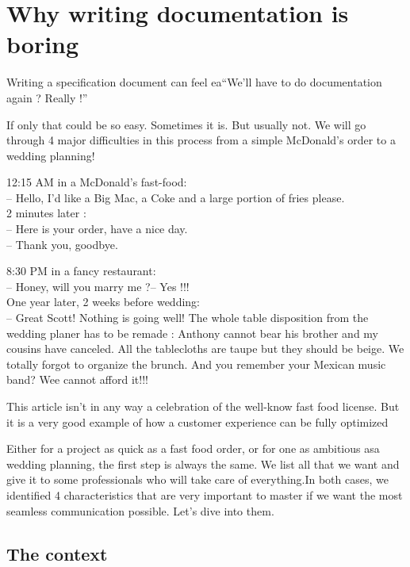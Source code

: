 \setchapterpreamble[u]{\margintoc}
\chapter{Why writing documentation is boring}
\label{sec:WhyBoring}

Writing a specification document can feel ea“We’ll have to do documentation again ? Really !”

If only that could be so easy. Sometimes it is. But usually not. We will go through 4 major difficulties in this process from a simple McDonald’s order to a wedding planning! 

12:15 AM in a McDonald’s fast-food:\\
– Hello, I’d like a Big Mac, a Coke and a large portion of fries please.\\
2 minutes later :\\
– Here is your order, have a nice day.\\
– Thank you, goodbye.

8:30 PM in a fancy restaurant:\\
– Honey, will you marry me ?– Yes !!!\\
One year later, 2 weeks before wedding:\\
– Great Scott! Nothing is going well! The whole table disposition from the wedding planer has to be remade : Anthony cannot bear his brother and my cousins have canceled. All the tablecloths are taupe but they should be beige. We totally forgot to organize the brunch. And you remember your Mexican music band? Wee cannot afford it!!!

\begin{kaobox}[frametitle=Disclaimer]
	This article isn’t in any way a celebration of the well-know fast food license. But it is a very good example of how a customer experience can be fully optimized
\end{kaobox}

Either for a project as quick as a fast food order, or for one as ambitious asa wedding planning, the first step is always the same. We list all that we want and give it to some professionals who will take care of everything.In both cases, we identified 4 characteristics that are very important to master if we want the most seamless communication possible. Let’s dive into them.


\section{The context}

